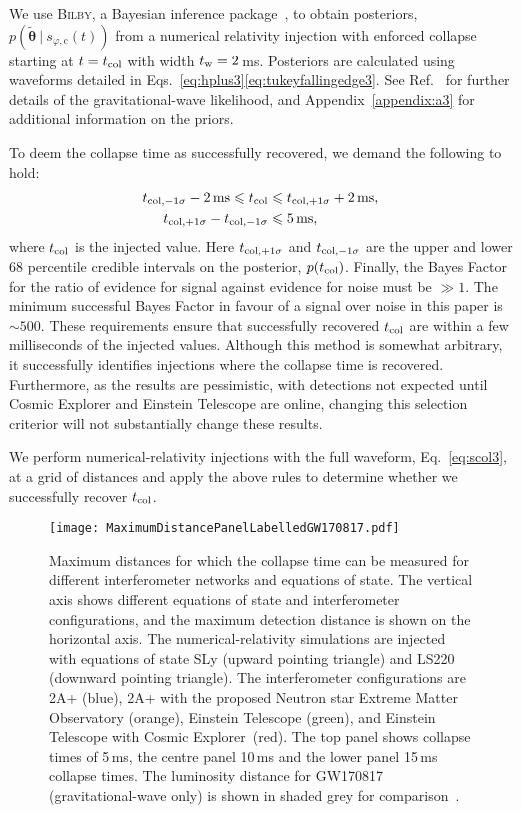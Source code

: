 \documentclass[../Thesis.tex]{subfiles}
\begin{document}
    We use \textsc{Bilby}, a Bayesian inference package~\cite{Ashton2019}, to obtain posteriors, $p(\boldsymbol{\tilde{\theta}}~|~s_{\varphi,\mathrm{c}}(t))$ from a numerical relativity injection with enforced collapse starting at $t=t_{\mathrm{col}}$ with width $t_{\mathrm{w}}=2$\,ms.
    Posteriors are calculated using waveforms detailed in Eqs.~\ref{eq:hplus3}\Hyphdash*\ref{eq:tukeyfallingedge3}. 
    See Ref.~\cite{Easter2020} for further details of the gravitational-wave likelihood, and Appendix~\ref{appendix:a3} for additional information on the priors.
    \par
    \pagebreak
    To deem the collapse time as successfully recovered, we demand the following to hold: 
\begin{align}
    t_{\mathrm{col,-1\sigma}} - 2\,\mathrm{ms} \leqslant t_{\mathrm{col}} & \leqslant  t_{\mathrm{col,+1\sigma}} + 2\,\mathrm{ms},\\
    t_{\mathrm{col,+1\sigma}} - t_{\mathrm{col,-1\sigma}} & \leqslant  5\,\mathrm{ms},
\end{align}
    where $t_{\mathrm{col}}$ is the injected value. 
    Here $t_{\mathrm{col,+1\sigma}}$ and $t_{\mathrm{col,-1\sigma}}$ are the upper and lower 68 percentile credible intervals on the posterior,  $p(t_{\mathrm{col}})$.
    Finally, the Bayes Factor for the ratio of evidence for signal against evidence for noise must be $\gg 1$.
    The minimum successful Bayes Factor in favour of a signal over noise in this paper is $\sim\!500$.
    These requirements ensure that successfully recovered $t_{\mathrm{col}}$ are within a few milliseconds of the  injected values. 
    Although this method is somewhat arbitrary, it successfully identifies injections where the collapse time is recovered.
    Furthermore, as the results are pessimistic, with detections not expected until Cosmic Explorer and Einstein Telescope are online, changing this selection criterior will not substantially change these results. \par

    
    We perform numerical-relativity injections with the full waveform, Eq.~\ref{eq:scol3}, at a grid of distances and apply the above rules to determine whether we successfully recover $t_{\mathrm{col}}$.
\begin{figure*}
    \centering
    \texttt{[image: MaximumDistancePanelLabelledGW170817.pdf]}
    \caption{Maximum distances for which the collapse time can be measured for different interferometer networks and equations of state. The vertical axis shows different equations of state and interferometer configurations, and the maximum detection distance is shown on the horizontal axis. The numerical-relativity simulations are injected with equations of state SLy (upward pointing triangle) and LS220 (downward pointing triangle). The interferometer configurations are 2A+ (blue), 2A+ with the proposed Neutron star Extreme Matter Observatory (orange), Einstein Telescope (green), and Einstein Telescope with Cosmic Explorer~(red). The top panel shows collapse times of 5\,ms, the centre panel 10\,ms and the lower panel 15\,ms collapse times. The  luminosity distance for GW170817 (gravitational-wave only) is shown in shaded grey for comparison~\cite{GW170817multi}.} 
    \label{fig:CollapseTimeDistanceGrid}
\end{figure*} 
\vspace{-0.25cm}    
\end{document}
